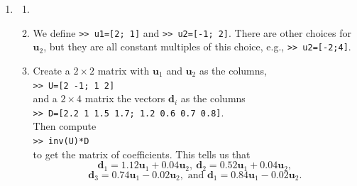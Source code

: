 \begin{sol}
\begin{enumerate}
    \item \begin{enumerate}
        \item 
        \item We define \texttt{>> u1=[2; 1]} and \texttt{>> u2=[-1; 2]}. There are other choices for $\mathbf{u}_2$, but they are all constant multiples of this choice, e.g., \texttt{>> u2=[-2;4]}.
        \item Create a $2 \times 2$ matrix with $\mathbf{u}_1$ and $\mathbf{u}_2$ as the columns,\\
        \texttt{>> U=[2 -1; 1 2]}\\
        and a $2 \times 4$ matrix the vectors $\mathbf{d}_i$ as the columns\\
        \texttt{>> D=[2.2 1 1.5 1.7; 1.2 0.6 0.7 0.8]}.\\
        Then compute\\
        \texttt{>> inv(U)*D}\\
        to get the matrix of coefficients. This tells us that $$\mathbf{d}_1=1.12\mathbf{u}_1+0.04\mathbf{u}_2, \ \mathbf{d}_2=0.52\mathbf{u}_1+0.04\mathbf{u}_2,$$ $$\mathbf{d}_3=0.74\mathbf{u}_1-0.02\mathbf{u}_2, \text{ and } \mathbf{d}_1=0.84\mathbf{u}_1-0.02\mathbf{u}_2.$$
    \end{enumerate}
		
	\end{enumerate}
\end{sol}

\pagebreak
\shipoutAnswer